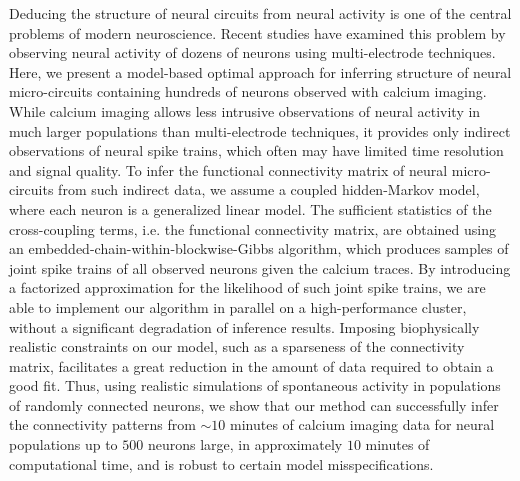 Deducing the structure of neural circuits from neural activity is one of the central problems of modern neuroscience. Recent studies have examined this problem by observing neural activity  of dozens of neurons using multi-electrode techniques. Here, we present a model-based optimal approach for inferring structure of neural micro-circuits containing hundreds of neurons observed with calcium imaging. While calcium imaging allows less intrusive observations of neural activity in much larger populations than multi-electrode techniques, it provides only indirect observations of neural spike trains, which often may have limited time resolution and signal quality.  To infer the functional connectivity matrix of neural micro-circuits from such indirect data, we assume a coupled hidden-Markov model, where each neuron is a generalized linear model.  The sufficient statistics of the cross-coupling terms, i.e. the functional connectivity matrix, are obtained using an embedded-chain-within-blockwise-Gibbs algorithm, which produces samples of joint spike trains of all observed neurons given the calcium traces. By introducing a factorized approximation for the likelihood of such joint spike trains, we are able to implement our algorithm in parallel on a high-performance cluster, without a significant degradation of inference results.  Imposing biophysically realistic constraints on our model, such as a sparseness of the connectivity matrix, facilitates a great reduction in the amount of data required to obtain a good fit.  Thus, using realistic simulations of spontaneous activity in populations of randomly connected neurons, we show that our method can successfully infer the connectivity patterns from $\sim 10$ minutes of calcium imaging data for neural populations up to $500$ neurons large, in approximately $10$ minutes of computational time, and is robust to certain model misspecifications.
